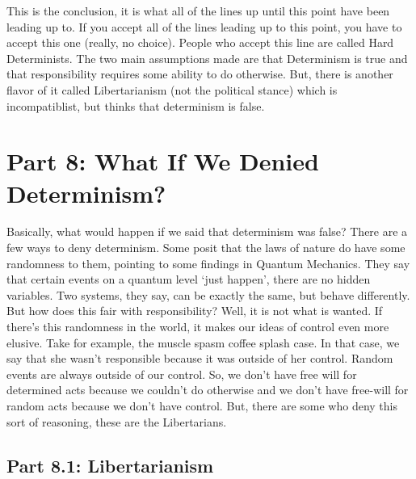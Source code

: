 This is the conclusion, it is what all of the lines up until this point have been leading up to. If you accept all of the lines leading up to this point, you have to accept this one (really, no choice).  People who accept this line are called Hard Determinists. The two main assumptions made are that Determinism is true and that responsibility requires some ability to do otherwise. But, there is another flavor of it called Libertarianism (not the political stance) which is incompatiblist, but thinks that determinism is false.

\chapter{Part 8: What If We Denied Determinism?}
Basically, what would happen if we said that determinism was false? There are a few ways to deny determinism. Some posit that the laws of nature do have some randomness to them, pointing to some findings in Quantum Mechanics. They say that certain events on a quantum level ‘just happen’, there are no hidden variables. Two systems, they say, can be exactly the same, but behave differently. But how does this fair with responsibility? Well, it is not what is wanted. If there’s this randomness in the world, it makes our ideas of control even more elusive. Take for example, the muscle spasm coffee splash case. In that case, we say that she wasn't responsible because it was outside of her control. Random events are always outside of our control. So, we don't have free will for determined acts because we couldn't do otherwise and we don't have free-will for random acts because we don't have control.  But, there are some who deny this sort of reasoning, these are the Libertarians.

\section{Part 8.1: Libertarianism}

